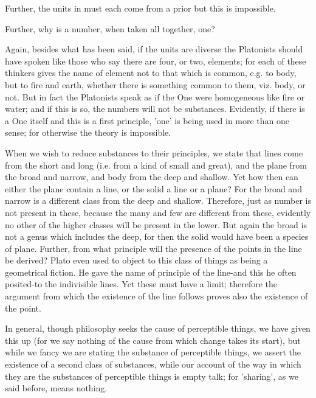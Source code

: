 \documentclass{article}
\begin{document}
Further, the units in must each come from a prior but this is impossible.

Further, why is a number, when taken all together, one?

Again, besides what has been said, if the units are diverse the Platonists should have spoken like those who say there are four, or two, elements; for each of these thinkers gives the name of element not to that which is common, e.g. to body, but to fire and earth, whether there is something common to them, viz. body, or not. But in fact the Platonists speak as if the One were homogeneous like fire or water; and if this is so, the numbers will not be substances. Evidently, if there is a One itself and this is a first principle, 'one' is being used in more than one sense; for otherwise the theory is impossible.

When we wish to reduce substances to their principles, we state that lines come from the short and long (i.e. from a kind of small and great), and the plane from the broad and narrow, and body from the deep and shallow. Yet how then can either the plane contain a line, or the solid a line or a plane? For the broad and narrow is a different class from the deep and shallow. Therefore, just as number is not present in these, because the many and few are different from these, evidently no other of the higher classes will be present in the lower. But again the broad is not a genus which includes the deep, for then the solid would have been a species of plane. Further, from what principle will the presence of the points in the line be derived? Plato even used to object to this class of things as being a geometrical fiction. He gave the name of principle of the line-and this he often posited-to the indivisible lines. Yet these must have a limit; therefore the argument from which the existence of the line follows proves also the existence of the point.

In general, though philosophy seeks the cause of perceptible things, we have given this up (for we say nothing of the cause from which change takes its start), but while we fancy we are stating the substance of perceptible things, we assert the existence of a second class of substances, while our account of the way in which they are the substances of perceptible things is empty talk; for 'sharing', as we said before, means nothing.
\end{document}
